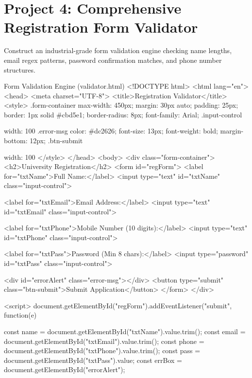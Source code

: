 \section{Project 4: Comprehensive Registration Form Validator}

\begin{practiceset}
Construct an industrial-grade form validation engine checking name lengths, email regex patterns, password confirmation matches, and phone number structures.
\end{practiceset}

\begin{htmlcode}{Form Validation Engine (validator.html)}
<!DOCTYPE html>
<html lang="en">
<head>
    <meta charset="UTF-8">
    <title>Registration Validator</title>
    <style>
        .form-container { max-width: 450px; margin: 30px auto; padding: 25px; border: 1px solid #cbd5e1; border-radius: 8px; font-family: Arial; }
        .input-control { width: 100%
        .error-msg { color: #dc2626; font-size: 13px; font-weight: bold; margin-bottom: 12px; }
        .btn-submit { width: 100%
    </style>
</head>
<body>
    <div class="form-container">
        <h2>University Registration</h2>
        <form id="regForm">
            <label for="txtName">Full Name:</label>
            <input type="text" id="txtName" class="input-control">

            <label for="txtEmail">Email Address:</label>
            <input type="text" id="txtEmail" class="input-control">

            <label for="txtPhone">Mobile Number (10 digits):</label>
            <input type="text" id="txtPhone" class="input-control">

            <label for="txtPass">Password (Min 8 chars):</label>
            <input type="password" id="txtPass" class="input-control">

            <div id="errorAlert" class="error-msg"></div>
            <button type="submit" class="btn-submit">Submit Application</button>
        </form>
    </div>

    <script>
        document.getElementById("regForm").addEventListener("submit", function(e) {
            const name = document.getElementById("txtName").value.trim();
            const email = document.getElementById("txtEmail").value.trim();
            const phone = document.getElementById("txtPhone").value.trim();
            const pass = document.getElementById("txtPass").value;
            const errBox = document.getElementById("errorAlert");

}}}
\end{htmlcode}
